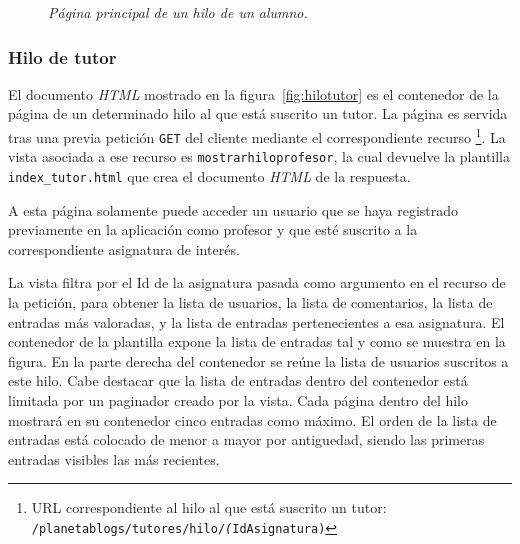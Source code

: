 \documentclass[a4paper, 12pt]{book}
\begin{document}
\begin{figure}
  \centering
  \caption{\textit{P\'agina principal de un hilo de un alumno.}}
  \label{fig:hiloalumno}
\end{figure}


\subsubsection{Hilo de tutor} 
\label{sec:hilotutor}
El documento \textit{HTML} mostrado en la figura~\ref{fig:hilotutor} es el contenedor de la p\'agina de un determinado hilo al que est\'a suscrito un tutor. 
La p\'agina es servida tras una previa petici\'on \texttt{GET} del cliente mediante el correspondiente recurso \footnote{URL correspondiente al hilo al que est\'a
suscrito un tutor: \texttt{/planetablogs/tutores/hilo/\textit(IdAsignatura)}}. La vista asociada a ese recurso es \texttt{mostrarhiloprofesor}, la cual 
devuelve la plantilla \texttt{index\_tutor.html} que crea el documento \textit{HTML} de la respuesta.

A esta p\'agina solamente puede acceder un usuario que se haya registrado previamente en la aplicaci\'on como profesor y que est\'e suscrito a la
correspondiente asignatura de inter\'es.

La vista filtra por el Id de la asignatura pasada como argumento en el recurso de la petici\'on, para obtener la lista de 
usuarios, la lista de comentarios, la lista de entradas m\'as valoradas, y la lista de entradas pertenecientes a esa asignatura. 
El contenedor de la plantilla expone la lista de entradas tal y como se muestra en la figura. En la parte derecha del contenedor se re\'une la lista de 
usuarios suscritos a este hilo. Cabe destacar que la lista de entradas dentro del contenedor est\'a limitada por un paginador creado por la vista. Cada 
p\'agina dentro del hilo mostrar\'a en su contenedor cinco entradas como m\'aximo. El orden de la lista de entradas est\'a colocado de menor a mayor por 
antiguedad, siendo las primeras entradas visibles las m\'as recientes.
\end{document}
